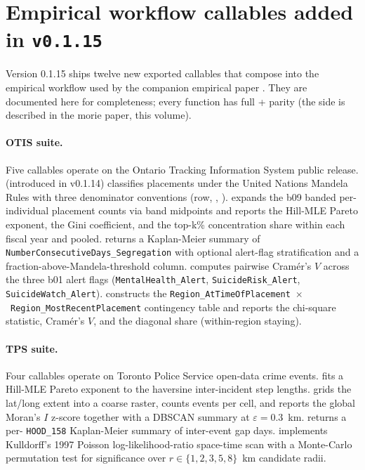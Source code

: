 \documentclass[article,shortnames,nojss]{jss}
\begin{document}
\section[Empirical workflow callables added in v0.1.15]{Empirical workflow callables added in \texttt{v0.1.15}}\label{sec:mrm-empirical-callables}

Version 0.1.15 ships twelve new exported callables that compose
into the empirical workflow used by the companion empirical paper
\citep{Ruhela2026MorieEmpirical}.  They are documented here for
completeness; every function has full  + 
parity (the  side is described in the morie
 paper, this volume).

\paragraph{OTIS suite.}  Five callables operate on the Ontario
Tracking Information System public release.  
(introduced in v0.1.14) classifies placements under the United Nations
Mandela Rules with three denominator conventions (row,
, ).
 expands the b09 banded
per-individual placement counts via band midpoints and reports the
Hill-MLE Pareto exponent, the Gini coefficient, and the top-k\%
concentration share within each fiscal year and pooled.
 returns a Kaplan-Meier summary of
\texttt{NumberConsecutiveDays\_Segregation} with optional alert-flag
stratification and a fraction-above-Mandela-threshold column.
 computes pairwise
Cram\'er's $V$ across the three b01 alert flags
(\texttt{MentalHealth\_Alert}, \texttt{SuicideRisk\_Alert},
\texttt{SuicideWatch\_Alert}).  
constructs the
\texttt{Region\_AtTimeOfPlacement}~$\times$~\texttt{Region\_MostRecentPlacement}
contingency table and reports the chi-square statistic, Cram\'er's
$V$, and the diagonal share (within-region staying).

\paragraph{TPS suite.}  Four callables operate on Toronto Police
Service open-data crime events.   fits
a Hill-MLE Pareto exponent to the haversine inter-incident step
lengths.   grids the lat/long
extent into a coarse raster, counts events per cell, and reports
the global Moran's $I$ z-score together with a DBSCAN summary at
$\varepsilon = 0.3$~km.
 returns a per-
\texttt{HOOD\_158} Kaplan-Meier summary of inter-event gap days.
 implements Kulldorff's 1997
Poisson log-likelihood-ratio space-time scan
\citep{kulldorff1997} with a Monte-Carlo permutation test for
significance over $r \in \{1, 2, 3, 5, 8\}$~km candidate radii.
\end{document}
